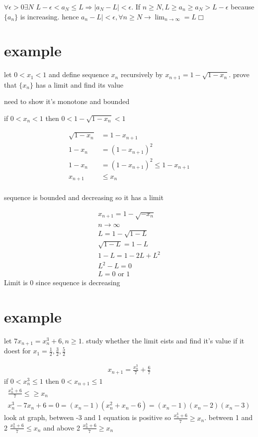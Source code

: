 \documentclass[letterpaper]{article}
\begin{document}
$\forall \epsilon>0\exists N$
$L-\epsilon<a_N\le L\Rightarrow|a_N-L|<\epsilon$. If $n\ge N, L\ge a_n\ge a_N>L-\epsilon$ because $\{a_n\}$ is increasing. hence $a_n-L|<\epsilon, \forall n\ge N\to\lim_{n\to\infty}=L\Box$
\section*{example}
let $0<x_1<1$ and define sequence $x_n$ recursively by $x_{n+1}=1-\sqrt{1-x_n}$. prove that $\{x_n\}$ has a limit and find its value

need to show it's monotone and bounded

if $0<x_n<1$ then $0<1-\sqrt{1-x_n}<1$

\begin{align*}
  \sqrt{1-x_n}&=1-x_{n+1}\\
  1-x_n&=(1-x_{n+1})^2\\
  1-x_n&=(1-x_{n+1})^2\le 1-x_{n+1}\\
  x_{n+1}&\le x_n\\
\end{align*}

sequence is bounded and decreasing so it has a limit

\begin{align*}
  x_{n+1}=1-\sqrt{-x_{n}}\\
  n\to\infty\\
  L=1-\sqrt{1-L}\\
  \sqrt{1-L}=1-L\\
  1-L=1-2L+L^2\\
  L^2-L=0\\
  L=0\text{ or }1
\end{align*}
Limit is 0 since sequence is decreasing

\section*{example}
let $7x_{n+1}=x_n^3+6,n\ge1$. study whether the limit eists and find it's value if it doest for $x_1=\frac{1}{2},\frac{3}{2},\frac{5}{2}$

\begin{align*}
  x_{n+1}=\frac{x_n^3}{7}+\frac{6}{7}
\end{align*}
if $0<x_n^3\le1$ then $0<x_{n+1}\le1$
\begin{align*}
  \frac{x_n^3+6}{7}\le\ge x_n\\
  x_n^3-7x_n+6=0=(x_n-1)(x_n^2+x_n-6)=(x_n-1)(x_n-2)(x_n-3)
\end{align*}
look at graph, between -3 and 1 equation is positive so $\frac{x_n^3+6}{7}\ge x_n$. between 1 and 2 $\frac{x_n^3+6}{7}\le x_n$ and above 2 $\frac{x_n^3+6}{7}\ge x_n$
\end{document}
